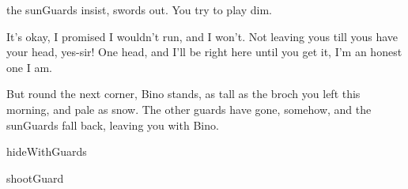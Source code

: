 the \glspl{sunGuard} insist, swords out.
You try to play dim.

\begin{speechtext}
  It's okay, I promised I wouldn't run, and I won't.
  Not leaving yous till yous have your head, yes-sir!
  One head, and I'll be right here until you get it, I'm an honest one I am.
\end{speechtext}

But round the next corner, Bino stands, as tall as the broch you left this morning, and pale as snow.
The other \glspl{guard} have gone, somehow, and the \glspl{sunGuard} fall back, leaving you with Bino.

\begin{selectPath}
  {}%
  {hideWithGuards}

  {}%
  {shootGuard}
\end{selectPath}

